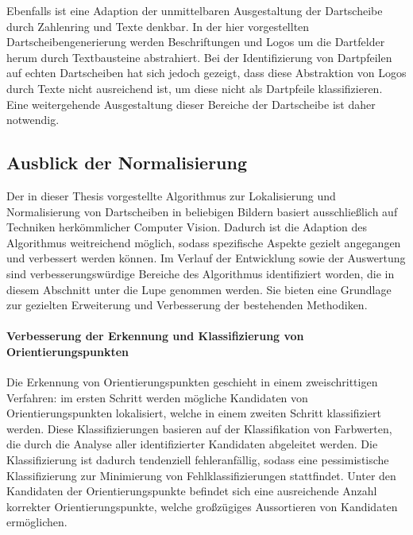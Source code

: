 Ebenfalls ist eine Adaption der unmittelbaren Ausgestaltung der Dartscheibe durch Zahlenring und Texte denkbar. In der hier vorgestellten Dartscheibengenerierung werden Beschriftungen und Logos um die Dartfelder herum durch Textbausteine abstrahiert. Bei der Identifizierung von Dartpfeilen auf echten Dartscheiben hat sich jedoch gezeigt, dass diese Abstraktion von Logos durch Texte nicht ausreichend ist, um diese nicht als Dartpfeile klassifizieren. Eine weitergehende Ausgestaltung dieser Bereiche der Dartscheibe ist daher notwendig.



\subsection{Ausblick der Normalisierung}
\label{sec:ausblick_cv}

Der in dieser Thesis vorgestellte Algorithmus zur Lokalisierung und Normalisierung von Dartscheiben in beliebigen Bildern basiert ausschließlich auf Techniken herkömmlicher Computer Vision. Dadurch ist die Adaption des Algorithmus weitreichend möglich, sodass spezifische Aspekte gezielt angegangen und verbessert werden können. Im Verlauf der Entwicklung sowie der Auswertung sind verbesserungswürdige Bereiche des Algorithmus identifiziert worden, die in diesem Abschnitt unter die Lupe genommen werden. Sie bieten eine Grundlage zur gezielten Erweiterung und Verbesserung der bestehenden Methodiken.

\paragraph{Verbesserung der Erkennung und Klassifizierung von Orientierungspunkten}

Die Erkennung von Orientierungspunkten geschieht in einem zweischrittigen Verfahren: im ersten Schritt werden mögliche Kandidaten von Orientierungspunkten lokalisiert, welche in einem zweiten Schritt klassifiziert werden. Diese Klassifizierungen basieren auf der Klassifikation von Farbwerten, die durch die Analyse aller identifizierter Kandidaten abgeleitet werden. Die Klassifizierung ist dadurch tendenziell fehleranfällig, sodass eine pessimistische Klassifizierung zur Minimierung von Fehlklassifizierungen stattfindet. Unter den Kandidaten der Orientierungspunkte befindet sich eine ausreichende Anzahl korrekter Orientierungspunkte, welche großzügiges Aussortieren von Kandidaten ermöglichen.


